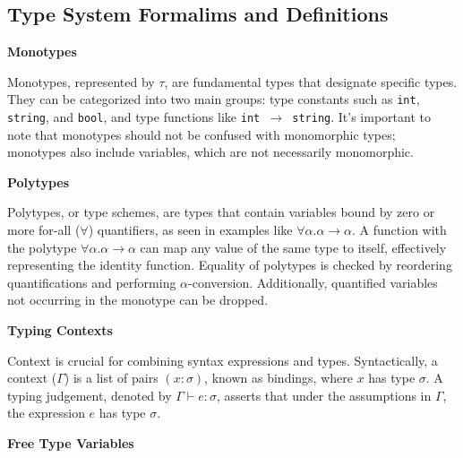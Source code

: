 \documentclass{l4proj}
\begin{document}
\subsection{Type System Formalims and Definitions}

\textbf{Monotypes}

Monotypes, represented by $\tau$, are fundamental types that designate specific types.
They can be categorized into two main groups: type constants such as \texttt{int}, \texttt{string}, and \texttt{bool}, and type functions like \texttt{int $\rightarrow$ string}.
It's important to note that monotypes should not be confused with monomorphic types; monotypes also include variables, which are not necessarily monomorphic.

\textbf{Polytypes}

Polytypes, or type schemes, are types that contain variables bound by zero or more for-all ($\forall$) quantifiers, as seen in examples like $\forall \alpha . \alpha \rightarrow \alpha$.
A function with the polytype $\forall \alpha . \alpha \rightarrow \alpha$ can map any value of the same type to itself, effectively representing the identity function.
Equality of polytypes is checked by reordering quantifications and performing $\alpha$-conversion.
Additionally, quantified variables not occurring in the monotype can be dropped.

\textbf{Typing Contexts}

Context is crucial for combining syntax expressions and types.
Syntactically, a context ($\Gamma$) is a list of pairs $(x : \sigma)$, known as bindings, where $x$ has type $\sigma$.
A typing judgement, denoted by $\Gamma \vdash e : \sigma$, asserts that under the assumptions in $\Gamma$, the expression $e$ has type $\sigma$.

\textbf{Free Type Variables}
\end{document}
